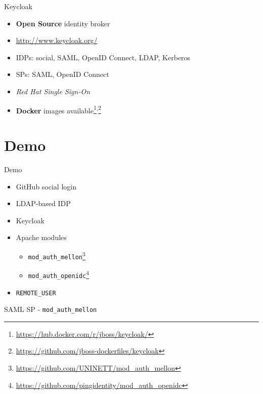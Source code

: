 \documentclass[ignorenonframetext,aspectratio=169]{beamer}
\providecommand{\tightlist}{%
  \setlength{\itemsep}{0pt}\setlength{\parskip}{0pt}}
\begin{document}
\begin{frame}{Keycloak}

\begin{itemize}
\tightlist
\item {\bf Open Source} identity broker
\item \url{http://www.keycloak.org/}
\item IDPs: social, SAML, OpenID Connect, LDAP, Kerberos
\item SPs: SAML, OpenID Connect
\item {\em Red Hat Single Sign-On}
\item {\bf Docker} images available\footnote{
        \url{https://hub.docker.com/r/jboss/keycloak/}
    }\textsuperscript{,}\footnote{
        \url{https://github.com/jboss-dockerfiles/keycloak}
    }
\end{itemize}
\end{frame}

\section{Demo}

\begin{frame}{Demo}
\begin{itemize}
\item GitHub social login
\item LDAP-based IDP
\item Keycloak
\item Apache modules
    \begin{itemize}
    \item {\tt mod\_auth\_mellon}\footnote{\url{https://github.com/UNINETT/mod_auth_mellon}}
    \item {\tt mod\_auth\_openidc}\footnote{\url{https://github.com/pingidentity/mod_auth_openidc}}
    \end{itemize}
\item {\tt REMOTE\_USER}
\end{itemize}
\end{frame}

\begin{frame}[fragile]{SAML SP - \tt mod\_auth\_mellon}
\end{frame}
\end{document}
